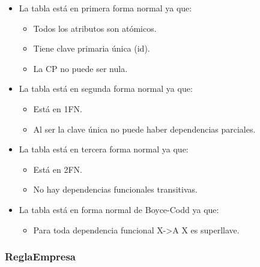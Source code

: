\documentclass[12pt,a4paperpaper,]{report}
\providecommand{\tightlist}{%
  \setlength{\itemsep}{0pt}\setlength{\parskip}{0pt}}
\begin{document}
\begin{itemize}
\tightlist
\item
  La tabla está en primera forma normal ya que:

  \begin{itemize}
  \tightlist
  \item
    Todos los atributos son atómicos.
  \item
    Tiene clave primaria única (id).
  \item
    La CP no puede ser nula.
  \end{itemize}
\item
  La tabla está en segunda forma normal ya que:

  \begin{itemize}
  \tightlist
  \item
    Está en 1FN.
  \item
    Al ser la clave única no puede haber dependencias parciales.
  \end{itemize}
\item
  La tabla está en tercera forma normal ya que:

  \begin{itemize}
  \tightlist
  \item
    Está en 2FN.
  \item
    No hay dependencias funcionales transitivas.
  \end{itemize}
\item
  La tabla está en forma normal de Boyce-Codd ya que:

  \begin{itemize}
  \tightlist
  \item
    Para toda dependencia funcional X-\textgreater{}A X es superllave.
  \end{itemize}
\end{itemize}

\subsubsection{ReglaEmpresa}\label{reglaempresa}
\end{document}
